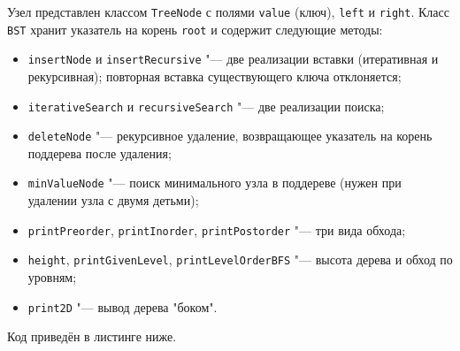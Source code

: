 \documentclass[otchet]{SCWorks}
\begin{document}
Узел представлен классом \texttt{TreeNode} с полями \texttt{value} (ключ),
\texttt{left} и \texttt{right}. Класс \texttt{BST} хранит указатель на корень
\texttt{root} и содержит следующие методы:
\begin{itemize}
  \item \texttt{insertNode} и \texttt{insertRecursive} "--- две реализации
        вставки (итеративная и рекурсивная); повторная вставка существующего
        ключа отклоняется;
  \item \texttt{iterativeSearch} и \texttt{recursiveSearch} "--- две
        реализации поиска;
  \item \texttt{deleteNode} "--- рекурсивное удаление, возвращающее указатель
        на корень поддерева после удаления;
  \item \texttt{minValueNode} "--- поиск минимального узла в поддереве
        (нужен при удалении узла с двумя детьми);
  \item \texttt{printPreorder}, \texttt{printInorder},
        \texttt{printPostorder} "--- три вида обхода;
  \item \texttt{height}, \texttt{printGivenLevel},
        \texttt{printLevelOrderBFS} "--- высота дерева и обход по уровням;
  \item \texttt{print2D} "--- вывод дерева "боком".
\end{itemize}
Код приведён в листинге ниже.
\end{document}
